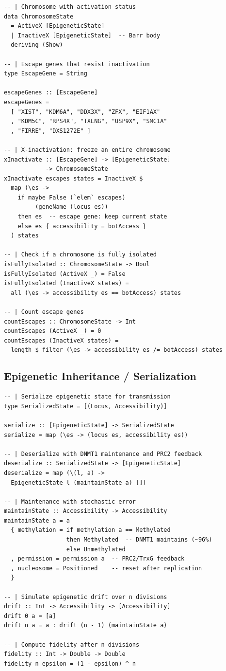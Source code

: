 \documentclass[12pt,a4paper]{article}
\begin{document}
\begin{lstlisting}[caption={X-inactivation as process isolation}]
-- | Chromosome with activation status
data ChromosomeState
  = ActiveX [EpigeneticState]
  | InactiveX [EpigeneticState]  -- Barr body
  deriving (Show)

-- | Escape genes that resist inactivation
type EscapeGene = String

escapeGenes :: [EscapeGene]
escapeGenes =
  [ "XIST", "KDM6A", "DDX3X", "ZFX", "EIF1AX"
  , "KDM5C", "RPS4X", "TXLNG", "USP9X", "SMC1A"
  , "FIRRE", "DXS1272E" ]

-- | X-inactivation: freeze an entire chromosome
xInactivate :: [EscapeGene] -> [EpigeneticState]
            -> ChromosomeState
xInactivate escapes states = InactiveX $
  map (\es ->
    if maybe False (`elem` escapes)
         (geneName (locus es))
    then es  -- escape gene: keep current state
    else es { accessibility = botAccess }
  ) states

-- | Check if a chromosome is fully isolated
isFullyIsolated :: ChromosomeState -> Bool
isFullyIsolated (ActiveX _) = False
isFullyIsolated (InactiveX states) =
  all (\es -> accessibility es == botAccess) states

-- | Count escape genes
countEscapes :: ChromosomeState -> Int
countEscapes (ActiveX _) = 0
countEscapes (InactiveX states) =
  length $ filter (\es -> accessibility es /= botAccess) states
\end{lstlisting}

\subsection{Epigenetic Inheritance / Serialization}

\begin{lstlisting}[caption={Epigenetic state serialization across replication}]
-- | Serialize epigenetic state for transmission
type SerializedState = [(Locus, Accessibility)]

serialize :: [EpigeneticState] -> SerializedState
serialize = map (\es -> (locus es, accessibility es))

-- | Deserialize with DNMT1 maintenance and PRC2 feedback
deserialize :: SerializedState -> [EpigeneticState]
deserialize = map (\(l, a) ->
  EpigeneticState l (maintainState a) [])

-- | Maintenance with stochastic error
maintainState :: Accessibility -> Accessibility
maintainState a = a
  { methylation = if methylation a == Methylated
                  then Methylated  -- DNMT1 maintains (~96%)
                  else Unmethylated
  , permission = permission a  -- PRC2/TrxG feedback
  , nucleosome = Positioned    -- reset after replication
  }

-- | Simulate epigenetic drift over n divisions
drift :: Int -> Accessibility -> [Accessibility]
drift 0 a = [a]
drift n a = a : drift (n - 1) (maintainState a)

-- | Compute fidelity after n divisions
fidelity :: Int -> Double -> Double
fidelity n epsilon = (1 - epsilon) ^ n
\end{lstlisting}
\end{document}
